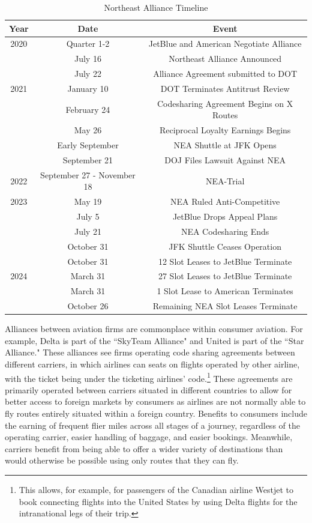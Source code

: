 \documentclass{article}
\begin{document}
    \begin{table}[tb]
		\caption{Northeast Alliance Timeline}
		\label{tab:NEA_Timeline}
		\begin{center}
			\begin{tabular}{ccc}
				\hline
				Year & Date & Event \\
				\hline
				2020 & Quarter 1-2 & JetBlue and American Negotiate Alliance \\ 
				& July 16 & Northeast Alliance Announced \\
				& July 22 & Alliance Agreement submitted to DOT \\
				\hline 
				2021 & January 10 & DOT Terminates Antitrust Review \\
				& February 24 & Codesharing Agreement Begins on {X} Routes \\
				& May 26 & Reciprocal Loyalty Earnings Begins \\
				& Early September & NEA Shuttle at JFK Opens \\
				& September 21 & DOJ Files Lawsuit Against NEA \\  
				\hline
				2022 & September 27 - November 18 & NEA-Trial \\
				\hline 
				2023 & May 19 & NEA Ruled Anti-Competitive \\
				& July 5 & JetBlue Drops Appeal Plans \\
				& July 21 & NEA Codesharing Ends \\
				& October 31 & JFK Shuttle Ceases Operation\\
				& October 31 & 12 Slot Leases to JetBlue Terminate \\
				\hline 
				2024 &  March 31  & 27 Slot Leases to JetBlue Terminate \\ 
				& March 31 & 1 Slot Lease to American Terminates \\
				& October 26 & Remaining NEA Slot Leases Terminate				 \end{tabular}
		\end{center}
	\end{table}

	
	Alliances between aviation firms are commonplace within consumer aviation. For example, Delta is part of the ``SkyTeam Alliance" and United is part of the ``Star Alliance." These alliances see firms operating code sharing agreements between different carriers, in which airlines can seats on flights operated by other airline, with the ticket being under the ticketing airlines' code.\footnote{This allows, for example, for passengers of the Canadian airline Westjet to book connecting flights into the United States by using Delta flights for the intranational legs of their trip.}  These agreements are primarily operated between carriers situated in different countries to allow for better access to foreign markets by consumers as airlines are not normally able to fly routes entirely situated within a foreign country. Benefits to consumers include the earning of frequent flier miles across all stages of a journey, regardless of the operating carrier, easier handling of baggage, and easier bookings. Meanwhile, carriers benefit from being able to offer a wider variety of destinations than would otherwise be possible using only routes that they can fly.
	
\end{document}
